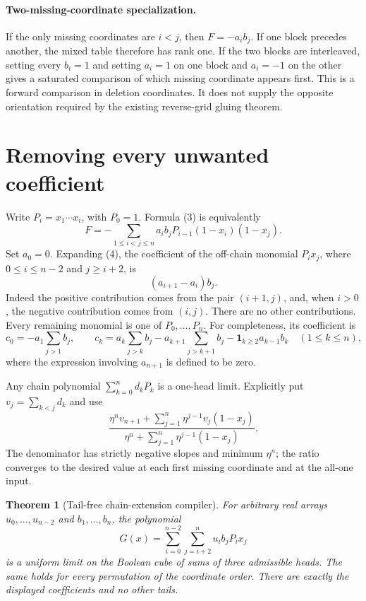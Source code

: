 \documentclass[11pt]{article}
\newtheorem{theorem}{Theorem}
\begin{document}
\paragraph{Two-missing-coordinate specialization.}
If the only missing coordinates are $i<j$, then $F=-a_i b_j$.
If one block precedes another, the mixed table therefore has rank one.
If the two blocks are interleaved, setting every $b_i=1$ and setting
$a_i=1$ on one block and $a_i=-1$ on the other gives a saturated
comparison of which missing coordinate appears first. This is a
forward comparison in deletion coordinates. It does not supply the
opposite orientation required by the existing reverse-grid gluing
theorem.

\section{Removing every unwanted coefficient}

Write $P_i=x_1\cdots x_i$, with $P_0=1$. Formula (3) is equivalently
\[
 F=-\sum_{1\le i<j\le n}a_i b_j
                      P_{i-1}(1-x_i)(1-x_j).       \tag{4}
\]
Set $a_0=0$. Expanding (4), the coefficient of the off-chain monomial
$P_i x_j$, where $0\le i\le n-2$ and $j\ge i+2$, is
\[
                         (a_{i+1}-a_i)b_j.          \tag{5}
\]
Indeed the positive contribution comes from the pair $(i+1,j)$,
and, when $i>0$, the negative contribution comes from $(i,j)$.
There are no other contributions. Every remaining monomial is one
of $P_0,\ldots,P_n$. For completeness, its coefficient is
\[
 c_0=-a_1\sum_{j>1}b_j,
 \qquad
 c_k=a_k\sum_{j>k}b_j-a_{k+1}\sum_{j>k+1}b_j
                  -\mathbf1_{k\ge2}a_{k-1}b_k
       \quad(1\le k\le n),                         \tag{6}
\]
where the expression involving $a_{n+1}$ is defined to be zero.

Any chain polynomial $\sum_{k=0}^n d_kP_k$ is a one-head limit.
Explicitly put $v_j=\sum_{k<j}d_k$ and use
\[
 \frac{\eta^n v_{n+1}+
             \sum_{j=1}^n\eta^{j-1}v_j(1-x_j)}
      {\eta^n+\sum_{j=1}^n\eta^{j-1}(1-x_j)}.        \tag{7}
\]
The denominator has strictly negative slopes and minimum $\eta^n$;
the ratio converges to the desired value at each first missing
coordinate and at the all-one input.

\begin{theorem}[Tail-free chain-extension compiler]\label{thm:compiler}
For arbitrary real arrays $u_0,\ldots,u_{n-2}$ and $b_1,\ldots,b_n$,
the polynomial
\[
 G(x)=\sum_{i=0}^{n-2}\sum_{j=i+2}^n
                                  u_i b_j P_i x_j                 \tag{8}
\]
is a uniform limit on the Boolean cube of sums of three admissible
heads. The same holds for every permutation of the coordinate order.
There are exactly the displayed coefficients and no other tails.
\end{theorem}
\end{document}
